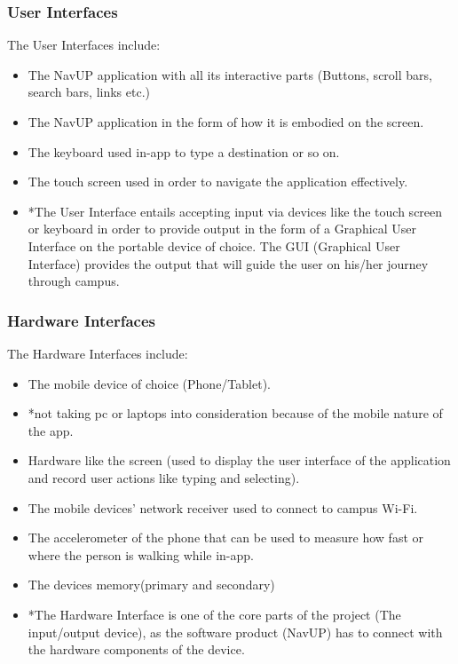 \documentclass[12pt]{article}
\begin{document}
		\subsubsection{User Interfaces}
		The User Interfaces include:
		\begin{itemize}
		\item The NavUP application with all its interactive parts (Buttons, scroll bars, search bars, links etc.)
		\item The NavUP application in the form of how it is embodied on the screen.
		\item The keyboard used in-app to type a destination or so on.
		\item The touch screen used in order to navigate the application effectively.
		\item *The User Interface entails accepting input via devices like the touch screen or keyboard in order to provide output in the form of a Graphical User Interface on the portable device of choice. The GUI (Graphical User Interface) provides the output that will guide the user on his/her journey through campus.
		\end{itemize}
		
		\subsubsection{Hardware Interfaces}
		The Hardware Interfaces include:
		\begin{itemize}
		\item The mobile device of choice (Phone/Tablet).
		\item *not taking pc or laptops into consideration because of the mobile nature of the app.
		\item Hardware like the screen (used to display the user interface of the application and record user actions like typing and selecting).
		\item The mobile devices’ network receiver used to connect to campus Wi-Fi.
		\item The accelerometer of the phone that can be used to measure how fast or where the person is walking while in-app.
		\item The devices memory(primary and secondary)
		\item *The Hardware Interface is one of the core parts of the project (The input/output device), as the software product (NavUP) has to connect with the hardware components of the device.
		\end{itemize}
		
\end{document}
